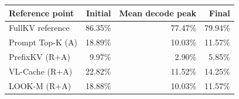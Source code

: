 \begin{tabular}{lrrr}
\toprule
Reference point & Initial & Mean decode peak & Final\\
\midrule
FullKV reference & 86.35\% & 77.47\% & 79.94\%\\
Prompt Top-K (A) & 18.89\% & 10.03\% & 11.57\%\\
PrefixKV (R+A) & 9.97\% & 2.90\% & 5.85\%\\
VL-Cache (R+A) & 22.82\% & 11.52\% & 14.25\%\\
LOOK-M (R+A) & 18.88\% & 10.03\% & 11.57\%\\
\bottomrule
\end{tabular}
